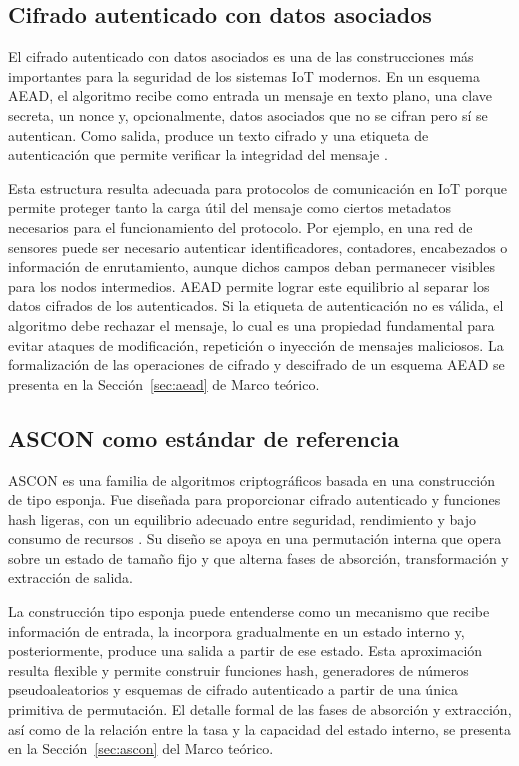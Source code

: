 \subsection{Cifrado autenticado con datos asociados}

El cifrado autenticado con datos asociados es una de las construcciones más importantes para la seguridad de los sistemas IoT modernos. En un esquema AEAD, el algoritmo recibe como entrada un mensaje en texto plano, una clave secreta, un nonce y, opcionalmente, datos asociados que no se cifran pero sí se autentican. Como salida, produce un texto cifrado y una etiqueta de autenticación que permite verificar la integridad del mensaje \cite{Katz2020IntroductionCryptography}.

Esta estructura resulta adecuada para protocolos de comunicación en IoT porque permite proteger tanto la carga útil del mensaje como ciertos metadatos necesarios para el funcionamiento del protocolo. Por ejemplo, en una red de sensores puede ser necesario autenticar identificadores, contadores, encabezados o información de enrutamiento, aunque dichos campos deban permanecer visibles para los nodos intermedios. AEAD permite lograr este equilibrio al separar los datos cifrados de los autenticados. Si la etiqueta de autenticación no es válida, el algoritmo debe rechazar el mensaje, lo cual es una propiedad fundamental para evitar ataques de modificación, repetición o inyección de mensajes maliciosos. La formalización de las operaciones de cifrado y descifrado de un esquema AEAD se presenta en la Sección~\ref{sec:aead} de Marco teórico.

\subsection{ASCON como estándar de referencia}

ASCON es una familia de algoritmos criptográficos basada en una construcción de tipo esponja. Fue diseñada para proporcionar cifrado autenticado y funciones hash ligeras, con un equilibrio adecuado entre seguridad, rendimiento y bajo consumo de recursos \cite{Dobraunig2021AsconHashing,Bertoni2007SpongeFunctions,Dobraunig2021AsconProcess}. Su diseño se apoya en una permutación interna que opera sobre un estado de tamaño fijo y que alterna fases de absorción, transformación y extracción de salida.

La construcción tipo esponja puede entenderse como un mecanismo que recibe información de entrada, la incorpora gradualmente en un estado interno y, posteriormente, produce una salida a partir de ese estado. Esta aproximación resulta flexible y permite construir funciones hash, generadores de números pseudoaleatorios y esquemas de cifrado autenticado a partir de una única primitiva de permutación. El detalle formal de las fases de absorción y extracción, así como de la relación entre la tasa y la capacidad del estado interno, se presenta en la Sección~\ref{sec:ascon} del Marco teórico.

